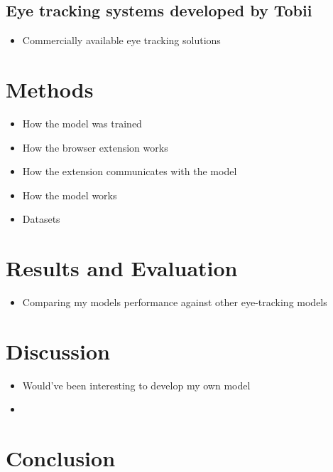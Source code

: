 \documentclass[twocolumn]{report}
\begin{document}
\section{Eye tracking systems developed by Tobii}

\begin{itemize}
    \item Commercially available eye tracking solutions
\end{itemize}

\chapter{Methods}
\begin{itemize}
    \item How the model was trained 
    \item How the browser extension works 
    \item How the extension communicates with the model 
    \item How the model works 
    \item Datasets
\end{itemize}

\chapter{Results and Evaluation}

\begin{itemize}
    \item Comparing my models performance against other eye-tracking models 
\end{itemize}

\chapter{Discussion}

\begin{itemize}
    \item Would've been interesting to develop my own model 
    \item 
\end{itemize}

\chapter{Conclusion}

\printbibliography
\end{document}
